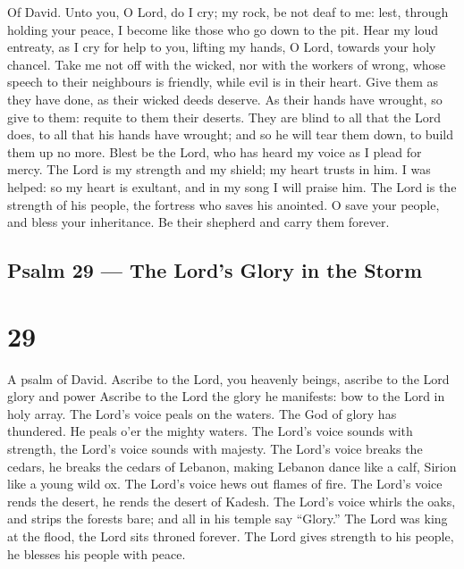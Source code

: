 Of David.  Unto you, O Lord, do I cry; my rock, be not deaf
to me: lest, through holding your peace, I become like those who go down
to the pit.  Hear my loud entreaty, as I cry for help to
you, lifting my hands, O Lord, towards your holy chancel. 
Take me not off with the wicked, nor with the workers of wrong, whose
speech to their neighbours is friendly, while evil is in their heart.
 Give them as they have done, as their wicked deeds deserve.
As their hands have wrought, so give to them: requite to them their
deserts.  They are blind to all that the Lord does, to all
that his hands have wrought; and so he will tear them down, to build
them up no more.  Blest be the Lord, who has heard my voice
as I plead for mercy.  The Lord is my strength and my
shield; my heart trusts in him. I was helped: so my heart is exultant,
and in my song I will praise him.  The Lord is the strength
of his people, the fortress who saves his anointed.  O save
your people, and bless your inheritance. Be their shepherd and carry
them forever.

\hypertarget{psalm-29-the-lords-glory-in-the-storm}{%
\subsection{Psalm 29 --- The Lord's Glory in the
Storm}\label{psalm-29-the-lords-glory-in-the-storm}}

\hypertarget{section-28}{%
\section{29}\label{section-28}}

A psalm of David.  Ascribe to the Lord, you heavenly beings,
ascribe to the Lord glory and power  Ascribe to the Lord the
glory he manifests: bow to the Lord in holy array.  The
Lord's voice peals on the waters. The God of glory has thundered. He
peals o'er the mighty waters.  The Lord's voice sounds with
strength, the Lord's voice sounds with majesty.  The Lord's
voice breaks the cedars, he breaks the cedars of Lebanon, 
making Lebanon dance like a calf, Sirion like a young wild ox.
 The Lord's voice hews out flames of fire.  The
Lord's voice rends the desert, he rends the desert of Kadesh.
 The Lord's voice whirls the oaks, and strips the forests
bare; and all in his temple say ``Glory.''  The Lord was
king at the flood, the Lord sits throned forever.  The Lord
gives strength to his people, he blesses his people with peace.


